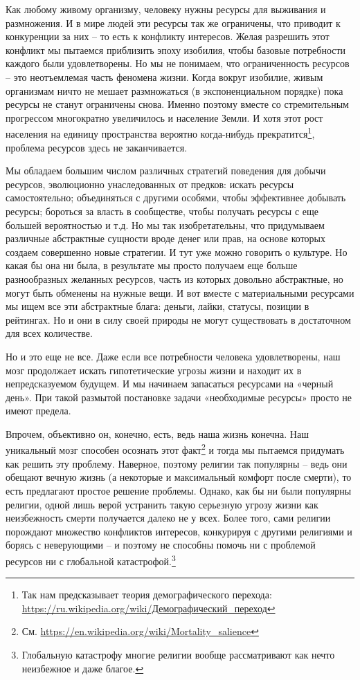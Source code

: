 \documentclass[12pt,a4paper]{report}
\begin{document}
Как любому живому организму, человеку нужны ресурсы для выживания и размножения. И в мире людей эти ресурсы так же ограничены, что приводит к конкуренции за них -- то есть к конфликту интересов. Желая разрешить этот конфликт мы пытаемся приблизить эпоху изобилия, чтобы базовые потребности каждого были удовлетворены. Но мы не понимаем, что ограниченность ресурсов -- это неотъемлемая часть феномена жизни. Когда вокруг изобилие, живым организмам ничто не мешает размножаться (в экспоненциальном порядке) пока ресурсы не станут ограничены снова. Именно поэтому вместе со стремительным прогрессом многократно увеличилось и население Земли. И хотя этот рост населения на единицу пространства вероятно когда-нибудь прекратится\footnote{Так нам предсказывает теория демографического перехода: \href{https://ru.wikipedia.org/wiki/\%D0\%94\%D0\%B5\%D0\%BC\%D0\%BE\%D0\%B3\%D1\%80\%D0\%B0\%D1\%84\%D0\%B8\%D1\%87\%D0\%B5\%D1\%81\%D0\%BA\%D0\%B8\%D0\%B9_\%D0\%BF\%D0\%B5\%D1\%80\%D0\%B5\%D1\%85\%D0\%BE\%D0\%B4}{https://ru.wikipedia.org/wiki/Демографический\_переход}}, проблема ресурсов здесь не заканчивается.

\noindent Мы обладаем большим числом различных стратегий поведения для добычи ресурсов, эволюционно унаследованных от предков: искать ресурсы самостоятельно; объединяться с другими особями, чтобы эффективнее добывать ресурсы; бороться за власть в сообществе, чтобы получать ресурсы с еще большей вероятностью и т.д. Но мы так изобретательны, что придумываем различные абстрактные сущности вроде денег или прав, на основе которых создаем совершенно новые стратегии. И тут уже можно говорить о культуре. Но какая бы она ни была, в результате мы просто получаем еще больше разнообразных желанных ресурсов, часть из которых довольно абстрактные, но могут быть обменены на нужные вещи. И вот вместе с материальными ресурсами мы ищем все эти абстрактные блага: деньги, лайки, статусы, позиции в рейтингах. Но и они в силу своей природы не могут существовать в достаточном для всех количестве.

\noindent Но и это еще не все. Даже если все потребности человека удовлетворены, наш мозг продолжает искать гипотетические угрозы жизни и находит их в непредсказуемом будущем. И мы начинаем запасаться ресурсами на «черный день». При такой размытой постановке задачи «необходимые ресурсы» просто не имеют предела.

\noindent Впрочем, объективно он, конечно, есть, ведь наша жизнь конечна. Наш уникальный мозг способен осознать этот факт\footnote{См. \url{https://en.wikipedia.org/wiki/Mortality_salience}} и тогда мы пытаемся придумать как решить эту проблему. Наверное, поэтому религии так популярны -- ведь они обещают вечную жизнь (а некоторые и максимальный комфорт после смерти), то есть предлагают простое решение проблемы. Однако, как бы ни были популярны религии, одной лишь верой устранить такую серьезную угрозу жизни как неизбежность смерти получается далеко не у всех. Более того, сами религии порождают множество конфликтов интересов, конкурируя с другими религиями и борясь с неверующими -- и поэтому не способны помочь ни с проблемой ресурсов ни с глобальной катастрофой.\footnote{Глобальную катастрофу многие религии вообще рассматривают как нечто неизбежное и даже благое.}
\end{document}

